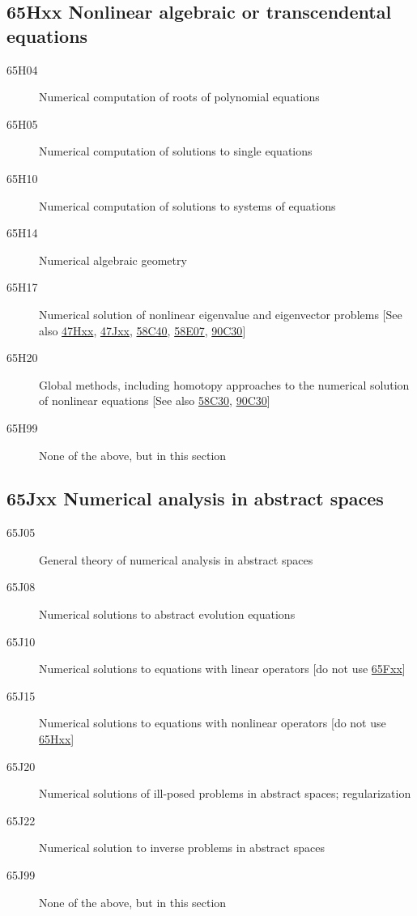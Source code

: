 \subsection*{65Hxx  Nonlinear algebraic or transcendental equations }\label{65Hxx}
\begin{description}  
\item [65H04]\label{65H04} Numerical computation of roots of polynomial equations
\item [65H05]\label{65H05} Numerical computation of solutions to single equations
\item [65H10]\label{65H10} Numerical computation of solutions to systems of equations
\item [65H14]\label{65H14} Numerical algebraic geometry
\item [65H17]\label{65H17} Numerical solution of nonlinear eigenvalue and eigenvector problems [See also \hyperref[47Hxx]{47Hxx}, \hyperref[47Jxx]{47Jxx}, \hyperref[58C40]{58C40}, \hyperref[58E07]{58E07}, \hyperref[90C30]{90C30}]
\item [65H20]\label{65H20} Global methods, including homotopy approaches to the numerical solution of nonlinear equations [See also \hyperref[58C30]{58C30}, \hyperref[90C30]{90C30}]
\item [65H99]\label{65H99} None of the above, but in this section
\end{description}
\subsection*{65Jxx  Numerical analysis in abstract spaces }\label{65Jxx}
\begin{description}  
\item [65J05]\label{65J05} General theory of numerical analysis in abstract spaces
\item [65J08]\label{65J08} Numerical solutions to abstract evolution equations
\item [65J10]\label{65J10} Numerical solutions to equations with linear operators [do not use \hyperref[65Fxx]{65Fxx}]
\item [65J15]\label{65J15} Numerical solutions to equations with nonlinear operators [do not use \hyperref[65Hxx]{65Hxx}]
\item [65J20]\label{65J20} Numerical solutions of ill-posed problems in abstract spaces; regularization
\item [65J22]\label{65J22} Numerical solution to inverse problems in abstract spaces
\item [65J99]\label{65J99} None of the above, but in this section
\end{description}
